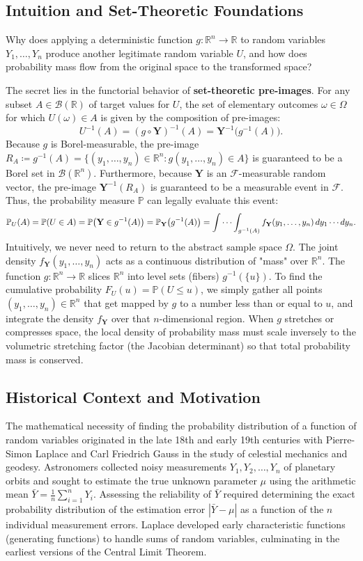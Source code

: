 \documentclass[11pt, letterpaper]{article}
\theoremstyle{definition}
\theoremstyle{remark}
\newcommand{\R}{\mathbb{R}}
\newcommand{\Prob}{\mathbb{P}}
\newcommand{\F}{\mathcal{F}}
\begin{document}
\subsection{Intuition and Set-Theoretic Foundations}

Why does applying a deterministic function $g: \R^n \to \R$ to random variables $Y_1, \dots, Y_n$ produce another legitimate random variable $U$, and how does probability mass flow from the original space to the transformed space?

The secret lies in the functorial behavior of \textbf{set-theoretic pre-images}. For any subset $A \in \mathcal{B}(\R)$ of target values for $U$, the set of elementary outcomes $\omega \in \Omega$ for which $U(\omega) \in A$ is given by the composition of pre-images:
\[
    U^{-1}(A) = (g \circ \mathbf{Y})^{-1}(A) = \mathbf{Y}^{-1}\big(g^{-1}(A)\big).
\]
Because $g$ is Borel-measurable, the pre-image $R_A \coloneqq g^{-1}(A) = \{(y_1, \dots, y_n) \in \R^n : g(y_1, \dots, y_n) \in A\}$ is guaranteed to be a Borel set in $\mathcal{B}(\R^n)$. Furthermore, because $\mathbf{Y}$ is an $\F$-measurable random vector, the pre-image $\mathbf{Y}^{-1}(R_A)$ is guaranteed to be a measurable event in $\F$. Thus, the probability measure $\Prob$ can legally evaluate this event:
\[
    \Prob_U(A) = \Prob(U \in A) = \Prob\big(\mathbf{Y} \in g^{-1}(A)\big) = \Prob_{\mathbf{Y}}\big(g^{-1}(A)\big) = \idotsint_{g^{-1}(A)} f_{\mathbf{Y}}(y_1, \dots, y_n) \, dy_1 \cdots dy_n.
\]
Intuitively, we never need to return to the abstract sample space $\Omega$. The joint density $f_{\mathbf{Y}}(y_1, \dots, y_n)$ acts as a continuous distribution of "mass" over $\R^n$. The function $g: \R^n \to \R$ slices $\R^n$ into level sets (fibers) $g^{-1}(\{u\})$. To find the cumulative probability $F_U(u) = \Prob(U \le u)$, we simply gather all points $(y_1, \dots, y_n) \in \R^n$ that get mapped by $g$ to a number less than or equal to $u$, and integrate the density $f_{\mathbf{Y}}$ over that $n$-dimensional region. When $g$ stretches or compresses space, the local density of probability mass must scale inversely to the volumetric stretching factor (the Jacobian determinant) so that total probability mass is conserved.

\subsection{Historical Context and Motivation}

The mathematical necessity of finding the probability distribution of a function of random variables originated in the late 18th and early 19th centuries with Pierre-Simon Laplace and Carl Friedrich Gauss in the study of celestial mechanics and geodesy. Astronomers collected noisy measurements $Y_1, Y_2, \dots, Y_n$ of planetary orbits and sought to estimate the true unknown parameter $\mu$ using the arithmetic mean $\bar{Y} = \frac{1}{n}\sum_{i=1}^n Y_i$. Assessing the reliability of $\bar{Y}$ required determining the exact probability distribution of the estimation error $|\bar{Y} - \mu|$ as a function of the $n$ individual measurement errors. Laplace developed early characteristic functions (generating functions) to handle sums of random variables, culminating in the earliest versions of the Central Limit Theorem.
\end{document}
